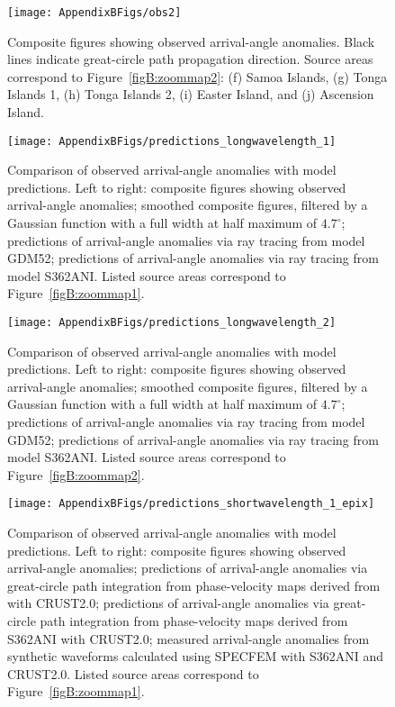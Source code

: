 \documentclass[12pt,oneside]{book}
\newcommand{\degree}[1]{\mbox{$#1^{\circ}$}}
\begin{document}
%
\begin{figure} 
\begin{center}
\texttt{[image: AppendixBFigs/obs2]} 
\caption[Composite arrival-angle anomaly observations, continued]{Composite figures showing observed arrival-angle anomalies. Black lines indicate great-circle path propagation direction. Source areas correspond to Figure~\ref{figB:zoommap2}: (f) Samoa Islands, (g) Tonga Islands 1, (h) Tonga Islands 2, (i) Easter Island, and (j) Ascension Island. }
\label{figB:obs2}
\end{center}
\end{figure}
%
\begin{figure} 
\begin{center}
\texttt{[image: AppendixBFigs/predictions\_longwavelength\_1]} 
\caption[Predictions of long-wavelength arrival-angle anomalies]{Comparison of observed arrival-angle anomalies with model predictions. Left to right: composite figures showing observed arrival-angle anomalies; smoothed composite figures, filtered by a Gaussian function with a full width at half maximum of \degree{4.7}; predictions of arrival-angle anomalies via ray tracing from model GDM52; predictions of arrival-angle anomalies via ray tracing from model S362ANI. Listed source areas correspond to Figure~\ref{figB:zoommap1}. }
\label{figB:pred_long1}
\end{center}
\end{figure}
%
\begin{figure} 
\begin{center}
\texttt{[image: AppendixBFigs/predictions\_longwavelength\_2]} 
\caption[Predictions of long-wavelength arrival-angle anomalies, continued]{Comparison of observed arrival-angle anomalies with model predictions. Left to right: composite figures showing observed arrival-angle anomalies; smoothed composite figures, filtered by a Gaussian function with a full width at half maximum of \degree{4.7}; predictions of arrival-angle anomalies via ray tracing from model GDM52; predictions of arrival-angle anomalies via ray tracing from model S362ANI. Listed source areas correspond to Figure~\ref{figB:zoommap2}. }
\label{figB:pred_long2}
\end{center}
\end{figure}
%
\begin{figure} 
\begin{center}
\texttt{[image: AppendixBFigs/predictions\_shortwavelength\_1\_epix]} 
\caption[Predictions of short-wavelength arrival-angle anomalies]{Comparison of observed arrival-angle anomalies with model predictions. Left to right: composite figures showing observed arrival-angle anomalies; predictions of arrival-angle anomalies via great-circle path integration from phase-velocity maps derived from \citet{Nettles&Dziewonski2008} with CRUST2.0; predictions of arrival-angle anomalies via great-circle path integration from phase-velocity maps derived from S362ANI with CRUST2.0; measured arrival-angle anomalies from synthetic waveforms calculated using SPECFEM with S362ANI and CRUST2.0. Listed source areas correspond to Figure~\ref{figB:zoommap1}. }
\label{figB:pred_short1}
\end{center}
\end{figure}
\end{document}
